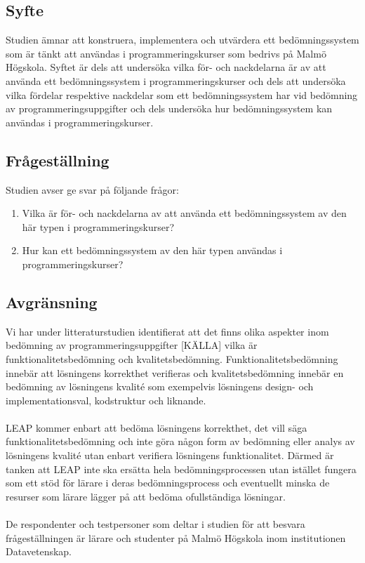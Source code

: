 \documentclass[a4paper,11pt]{article}
\begin{document}
{\subsection{Syfte}

Studien ämnar att konstruera, implementera och utvärdera ett bedömningssystem som är tänkt att användas i programmeringskurser som bedrivs på Malmö Högskola. Syftet är dels att undersöka vilka för- och nackdelarna är av att använda ett bedömningssystem i programmeringskurser och dels att undersöka vilka fördelar respektive nackdelar som ett bedömningssystem har vid bedömning av programmeringsuppgifter och dels undersöka hur bedömningssystem kan användas i programmeringskurser.

\subsection{Frågeställning}\label{frågeställning}

Studien avser ge svar på följande frågor:

\begin{enumerate}
\item
Vilka är för- och nackdelarna av att använda ett bedömningssystem av den här typen i programmeringskurser?
\item
Hur kan ett bedömningssystem av den här typen användas i programmeringskurser?
\end{enumerate}

\subsection{Avgränsning}

Vi har under litteraturstudien identifierat att det finns olika aspekter inom bedömning av programmeringsuppgifter [KÄLLA] vilka är funktionalitetsbedömning och kvalitetsbedömning. Funktionalitetsbedömning innebär att lösningens korrekthet verifieras och kvalitetsbedömning innebär en bedömning av lösningens kvalité som exempelvis lösningens design- och implementationsval, kodstruktur och liknande.
\\
\\
LEAP kommer enbart att bedöma lösningens korrekthet, det vill säga funktionalitetsbedömning och inte göra någon form av bedömning eller analys av lösningens kvalité utan enbart verifiera lösningens funktionalitet. Därmed är tanken att LEAP inte ska ersätta hela bedömningsprocessen utan istället fungera som ett stöd för lärare i deras bedömningsprocess och eventuellt minska de resurser som lärare lägger på att bedöma ofullständiga lösningar.
\\
\\
De respondenter och testpersoner som deltar i studien för att besvara frågeställningen är lärare och studenter på Malmö Högskola inom institutionen Datavetenskap.

}
\end{document}
